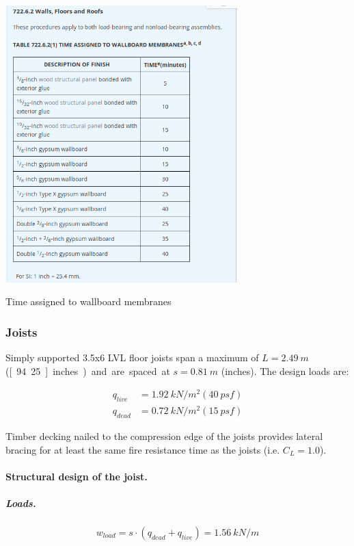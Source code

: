 \begin{table}
  \begin{center}
    \includegraphics[width= 90mm]{figures/fire_resistance_wallboard_membranes}
  \end{center}
  \caption{Time assigned to wallboard membranes}\label{tb_fire_resistance_wallboard_membranes}
\end{table}


\subsubsection{Joists}
Simply supported 3.5x6 LVL floor joists span a maximum of $L= 2.49\ m$ (\unit[94.25]{inches}) and are spaced at $s= 0.81\ m$ (\unit[32]{inches}). The design loads are:

\begin{align}
  q_{live}&= 1.92\ kN/m^2 (40\ psf) \\
  q_{dead}&= 0.72\ kN/m^2 (15\ psf)
\end{align}

Timber decking nailed to the compression edge of the joists provides lateral bracing for at least the same fire resistance time as the joists (i.e. $C_L= 1.0$).

\paragraph{Structural design of the joist.}

\subparagraph{Loads.}

\begin{equation}
  w_{load}= s \cdot (q_{dead}+q_{live})= 1.56\ kN/m
\end{equation}

